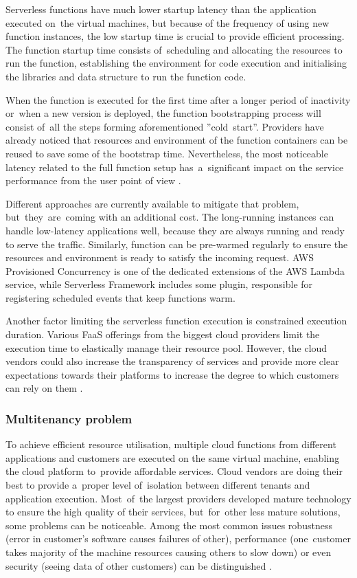 Serverless functions have much lower startup latency than the application executed on~the virtual machines, but because of the frequency of using new function instances, the low startup time is crucial to provide efficient processing. The function startup time consists of~scheduling and allocating the resources to run the function, establishing the environment for code execution and initialising the libraries and data structure to run the function code.

When the function is executed for the first time after a longer period of inactivity or~when a new version is deployed, the function bootstrapping process will consist of~all the steps forming aforementioned ''cold~start''. Providers have already noticed that resources and environment of the function containers can be reused to save some of the bootstrap time. Nevertheless, the most noticeable latency related to the full function setup has~a~significant impact on the service performance from the user point of view \cite{BerkeleyServerless}.

Different approaches are currently available to mitigate that problem, but~they~are~coming with an additional cost. The long-running instances can handle low-latency applications well, because they are always running and ready to serve the traffic. Similarly, function can be pre-warmed regularly to ensure the resources and environment is ready to satisfy the incoming request. AWS Provisioned Concurrency is one of the dedicated extensions of the AWS Lambda service, while Serverless Framework includes some plugin, responsible for registering scheduled events that keep functions warm.

Another factor limiting the serverless function execution is constrained execution duration. Various FaaS offerings from the biggest cloud providers limit the execution time to elastically manage their resource pool. However, the cloud vendors could also increase the transparency of services and provide more clear expectations towards their platforms to increase the degree to which customers can rely on them \cite{MartinFowlerServerless}.

\subsubsection{Multitenancy problem} \label{chapter:serverless-multitenancy-problem}

To achieve efficient resource utilisation, multiple cloud functions from different applications and customers are executed on the same virtual machine, enabling the cloud platform to~provide affordable services. Cloud vendors are doing their best to provide a~proper level of~isolation between different tenants and application execution. Most~of~the largest providers developed mature technology to ensure the high quality of their services, but~for~other less mature solutions, some problems can be noticeable. Among the most common issues robustness (error in customer’s software causes failures of other), performance (one~customer takes majority of the machine resources causing others to slow down) or even security (seeing data of other customers) can be distinguished \cite{MartinFowlerServerless}.


